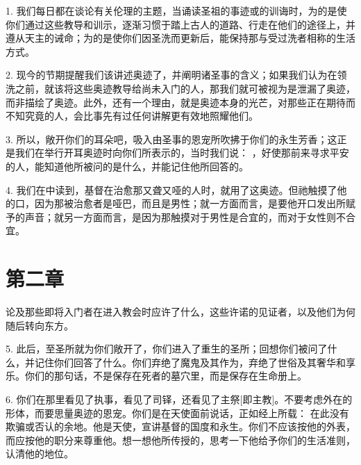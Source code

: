 1. 我们每日都在谈论有关伦理的主题，当诵读圣祖的事迹或的训诲时，为的是使你们通过这些教导和训示，逐渐习惯于踏上古人的道路、行走在他们的途径上，并遵从天主的诫命；为的是使你们因圣洗而更新后，能保持那与受过洗者相称的生活方式。\par

2. 现今的节期提醒我们该讲述奥迹了，并阐明诸圣事的含义；如果我们认为在领洗之前，就该将这些奥迹教导给尚未入门的人，那我们就可被视为是泄漏了奥迹，而非描绘了奥迹。此外，还有一个理由，就是奥迹本身的光芒，对那些正在期待而不知究竟的人，会比事先有过任何讲解更有效地照耀他们。\par

3. 所以，敞开你们的耳朵吧，吸入由圣事的恩宠所吹拂于你们的永生芳香；这正是我们在举行开耳奥迹时向你们所表示的，当时我们说： ，好使那前来寻求平安的人，能知道他所被问的是什么，并能记住他所回答的。\par

4. 我们在中读到，基督在治愈那又聋又哑的人时，就用了这奥迹。但祂触摸了他的口，因为那被治愈者是哑巴，而且是男性；就一方面而言，是要他开口发出所赋予的声音；就另一方面而言，是因为那触摸对于男性是合宜的，而对于女性则不合宜。\par


\section{第二章}

论及那些即将入门者在进入教会时应许了什么，这些许诺的见证者，以及他们为何随后转向东方。\par

5. 此后，至圣所就为你们敞开了，你们进入了重生的圣所；回想你们被问了什么，并记住你们回答了什么。你们弃绝了魔鬼及其作为，弃绝了世俗及其奢华和享乐。你们的那句话，不是保存在死者的墓穴里，而是保存在生命册上。\par

6. 你们在那里看见了执事，看见了司铎，还看见了主祭[即主教]。不要考虑外在的形体，而要思量奥迹的恩宠。你们是在天使面前说话，正如经上所载：  在此没有欺骗或否认的余地。他是天使，宣讲基督的国度和永生。你们不应该按他的外表，而应按他的职分来尊重他。想一想他所传授的，思考一下他给予你们的生活准则，认清他的地位。\par

